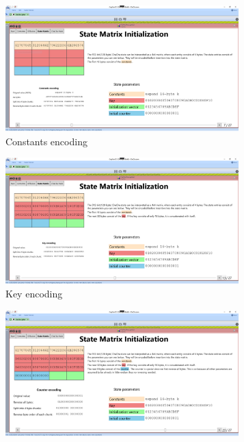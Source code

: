 \begin{figure}
\caption[State Matrix Initialization page]{Encoding of the state parameters on the State Matrix Initialization page}
\label{fig:statematrix.encoding}
\begin{subfigure}{0.5\textwidth}
  \centering
  \includegraphics[width=0.99\textwidth]{figures/ct2/state-matrix/1-state-matrix-constants.png}
  \caption{Constants encoding}
  \label{fig:statematrix.encoding.constants}
\end{subfigure}%
\begin{subfigure}{0.5\textwidth}
  \centering
  \includegraphics[width=0.99\textwidth]{figures/ct2/state-matrix/2-state-matrix-key.png}
  \caption{Key encoding}
  \label{fig:statematrix.encoding.key}
\end{subfigure}
\begin{subfigure}{0.5\textwidth}
  \centering
  \includegraphics[width=0.99\textwidth]{figures/ct2/state-matrix/3-state-matrix-counter.png}

\end{subfigure}
\end{figure}
